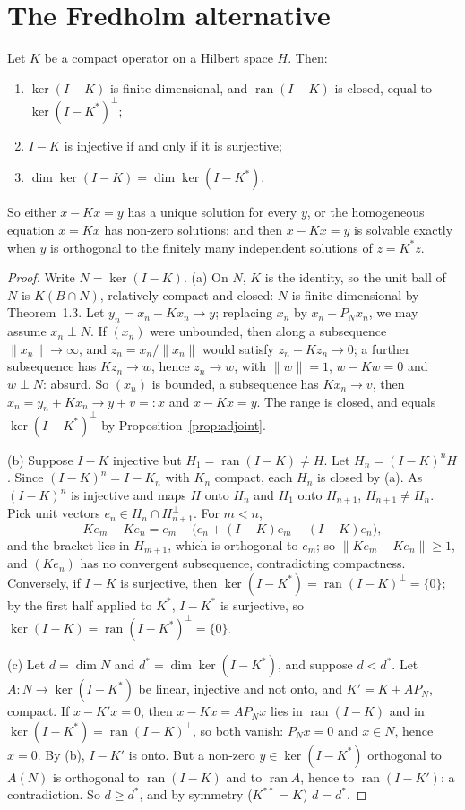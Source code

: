 \section{The Fredholm alternative}

\begin{theorem}\label{thm:fredholm}
Let $K$ be a compact operator on a Hilbert space $H$. Then:
\begin{enumerate}
\item[(a)] $\ker(I-K)$ is finite-dimensional, and $\operatorname{ran}(I-K)$ is closed, equal to $\ker(I-K^*)^\perp$;
\item[(b)] $I-K$ is injective if and only if it is surjective;
\item[(c)] $\dim\ker(I-K)=\dim\ker(I-K^*)$.
\end{enumerate}
So either $x-Kx=y$ has a unique solution for every $y$, or the homogeneous equation $x=Kx$ has non-zero solutions; and then $x-Kx=y$ is solvable exactly when $y$ is orthogonal to the finitely many independent solutions of $z=K^*z$.
\end{theorem}
\begin{proof}
Write $N=\ker(I-K)$. (a) On $N$, $K$ is the identity, so the unit ball of $N$ is $K(B\cap N)$, relatively compact and closed: $N$ is finite-dimensional by Theorem~1.3. Let $y_n=x_n-Kx_n\to y$; replacing $x_n$ by $x_n-P_Nx_n$, we may
assume $x_n\perp N$. If $(x_n)$ were unbounded, then along a subsequence $\|x_n\|\to\infty$, and $z_n=x_n/\|x_n\|$ would satisfy $z_n-Kz_n\to0$; a further subsequence has $Kz_n\to w$, hence $z_n\to w$, with $\|w\|=1$,
$w-Kw=0$ and $w\perp N$: absurd. So $(x_n)$ is bounded, a subsequence has $Kx_n\to v$, then $x_n=y_n+Kx_n\to y+v=:x$ and $x-Kx=y$. The range is closed, and equals $\ker(I-K^*)^\perp$ by Proposition~\ref{prop:adjoint}.

(b) Suppose $I-K$ injective but $H_1=\operatorname{ran}(I-K)\ne H$. Let $H_n=(I-K)^nH$. Since $(I-K)^n=I-K_n$ with $K_n$ compact, each $H_n$ is closed by (a). As $(I-K)^n$ is injective and maps $H$ onto $H_n$ and $H_1$ onto
$H_{n+1}$, $H_{n+1}\ne H_n$. Pick unit vectors $e_n\in H_n\cap H_{n+1}^\perp$. For $m<n$,
\[Ke_m-Ke_n=e_m-\bigl(e_n+(I-K)e_m-(I-K)e_n\bigr),\]
and the bracket lies in $H_{m+1}$, which is orthogonal to $e_m$; so $\|Ke_m-Ke_n\|\ge1$, and $(Ke_n)$ has no convergent subsequence, contradicting compactness. Conversely, if $I-K$ is surjective, then
$\ker(I-K^*)=\operatorname{ran}(I-K)^\perp=\{0\}$; by the first half applied to $K^*$, $I-K^*$ is surjective, so $\ker(I-K)=\operatorname{ran}(I-K^*)^\perp=\{0\}$.

(c) Let $d=\dim N$ and $d^*=\dim\ker(I-K^*)$, and suppose $d<d^*$. Let $A:N\to\ker(I-K^*)$ be linear, injective and not onto, and $K'=K+AP_N$, compact. If $x-K'x=0$, then $x-Kx=AP_Nx$ lies in $\operatorname{ran}(I-K)$ and in
$\ker(I-K^*)=\operatorname{ran}(I-K)^\perp$, so both vanish: $P_Nx=0$ and $x\in N$, hence $x=0$. By (b), $I-K'$ is onto. But a non-zero $y\in\ker(I-K^*)$ orthogonal to $A(N)$ is orthogonal to $\operatorname{ran}(I-K)$ and to $\operatorname{ran}A$,
hence to $\operatorname{ran}(I-K')$: a contradiction. So $d\ge d^*$, and by symmetry ($K^{**}=K$) $d=d^*$.
\end{proof}

